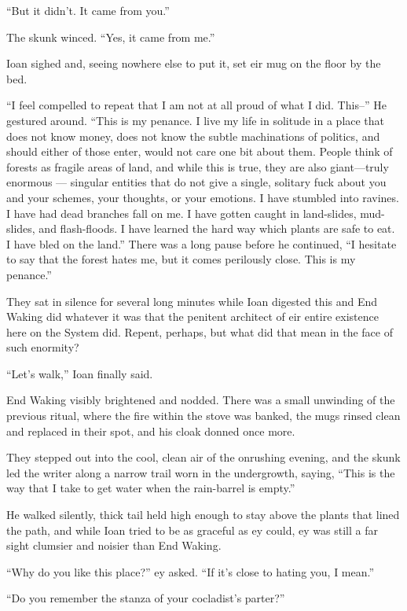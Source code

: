 ``But it didn't. It came from you.''

The skunk winced. ``Yes, it came from me.''

Ioan sighed and, seeing nowhere else to put it, set eir mug on the floor by the bed.

``I feel compelled to repeat that I am not at all proud of what I did. This--'' He gestured around. ``This is my penance. I live my life in solitude in a place that does not know money, does not know the subtle machinations of politics, and should either of those enter, would not care one bit about them. People think of forests as fragile areas of land, and while this is true, they are also giant---truly enormous — singular entities that do not give a single, solitary fuck about you and your schemes, your thoughts, or your emotions. I have stumbled into ravines. I have had dead branches fall on me. I have gotten caught in land-slides, mud-slides, and flash-floods. I have learned the hard way which plants are safe to eat. I have bled on the land.'' There was a long pause before he continued, ``I hesitate to say that the forest hates me, but it comes perilously close. This is my penance.''

They sat in silence for several long minutes while Ioan digested this and End Waking did whatever it was that the penitent architect of eir entire existence here on the System did. Repent, perhaps, but what did that mean in the face of such enormity?

``Let's walk,'' Ioan finally said.

End Waking visibly brightened and nodded. There was a small unwinding of the previous ritual, where the fire within the stove was banked, the mugs rinsed clean and replaced in their spot, and his cloak donned once more.

They stepped out into the cool, clean air of the onrushing evening, and the skunk led the writer along a narrow trail worn in the undergrowth, saying, ``This is the way that I take to get water when the rain-barrel is empty.''

He walked silently, thick tail held high enough to stay above the plants that lined the path, and while Ioan tried to be as graceful as ey could, ey was still a far sight clumsier and noisier than End Waking.

``Why do you like this place?'' ey asked. ``If it's close to hating you, I mean.''

``Do you remember the stanza of your cocladist's parter?''


